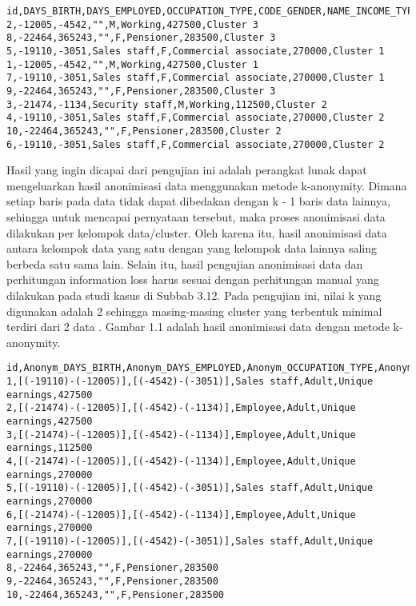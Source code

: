 \begin{lstlisting}[basicstyle=\ttfamily, frame=single,
	columns=fullflexible, keepspaces=true, breaklines=true, label=lst:fungsional_gkmc3, caption=Sampel Pengelompokan Data]
id,DAYS_BIRTH,DAYS_EMPLOYED,OCCUPATION_TYPE,CODE_GENDER,NAME_INCOME_TYPE,AMT_INCOME_TOTAL,Cluster
2,-12005,-4542,"",M,Working,427500,Cluster 3
8,-22464,365243,"",F,Pensioner,283500,Cluster 3
5,-19110,-3051,Sales staff,F,Commercial associate,270000,Cluster 1
1,-12005,-4542,"",M,Working,427500,Cluster 1
7,-19110,-3051,Sales staff,F,Commercial associate,270000,Cluster 1
9,-22464,365243,"",F,Pensioner,283500,Cluster 3
3,-21474,-1134,Security staff,M,Working,112500,Cluster 2
4,-19110,-3051,Sales staff,F,Commercial associate,270000,Cluster 2
10,-22464,365243,"",F,Pensioner,283500,Cluster 2
6,-19110,-3051,Sales staff,F,Commercial associate,270000,Cluster 2
\end{lstlisting}

\vspace{0.5cm}

Hasil yang ingin dicapai dari pengujian ini adalah perangkat lunak dapat mengeluarkan hasil anonimisasi data menggunakan metode k-anonymity. Dimana setiap baris pada data tidak dapat dibedakan dengan k - 1 baris data lainnya, sehingga untuk mencapai pernyataan tersebut, maka proses anonimisasi data dilakukan per kelompok data/cluster. Oleh karena itu, hasil anonimisasi data antara kelompok data yang satu dengan yang kelompok data lainnya saling berbeda satu sama lain. Selain itu, hasil pengujian anonimisasi data dan perhitungan information loss harus sesuai dengan perhitungan manual yang dilakukan pada studi kasus di Subbab 3.12. Pada pengujian ini, nilai k yang digunakan adalah 2 sehingga masing-masing cluster yang terbentuk minimal terdiri dari 2 data . Gambar 1.1 adalah hasil anonimisasi data dengan metode k-anonymity.

\newpage
\begin{lstlisting}[basicstyle=\ttfamily, frame=single,
	columns=fullflexible, keepspaces=true, breaklines=true, label=lst:fungsional_kanonymity1, caption=Hasil Anonimisasi K-Anonymity]
id,Anonym_DAYS_BIRTH,Anonym_DAYS_EMPLOYED,Anonym_OCCUPATION_TYPE,Anonym_CODE_GENDER,Anonym_NAME_INCOME_TYPE,AMT_INCOME_TOTAL
1,[(-19110)-(-12005)],[(-4542)-(-3051)],Sales staff,Adult,Unique earnings,427500
2,[(-21474)-(-12005)],[(-4542)-(-1134)],Employee,Adult,Unique earnings,427500
3,[(-21474)-(-12005)],[(-4542)-(-1134)],Employee,Adult,Unique earnings,112500
4,[(-21474)-(-12005)],[(-4542)-(-1134)],Employee,Adult,Unique earnings,270000
5,[(-19110)-(-12005)],[(-4542)-(-3051)],Sales staff,Adult,Unique earnings,270000
6,[(-21474)-(-12005)],[(-4542)-(-1134)],Employee,Adult,Unique earnings,270000
7,[(-19110)-(-12005)],[(-4542)-(-3051)],Sales staff,Adult,Unique earnings,270000
8,-22464,365243,"",F,Pensioner,283500
9,-22464,365243,"",F,Pensioner,283500
10,-22464,365243,"",F,Pensioner,283500
\end{lstlisting}

